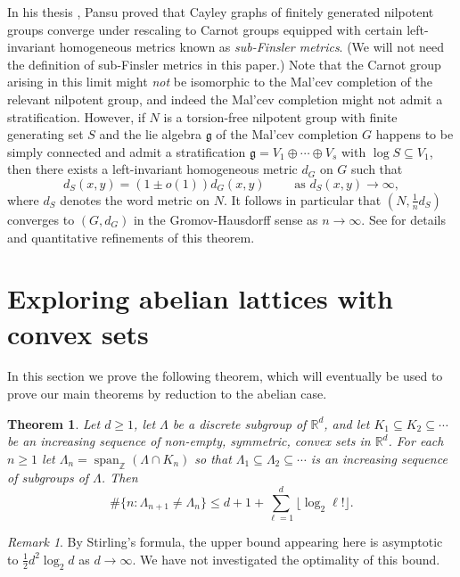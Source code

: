\documentclass[11pt]{article}
\numberwithin{equation}{section}
\theoremstyle{plain}
\newtheorem{thm}{Theorem}[section]
\theoremstyle{definition}
\theoremstyle{remark}
\newtheorem{remark}{Remark}[section]
\numberwithin{equation}{section}
\newcommand{\R}{\mathbb R}
\newcommand{\Z}{\mathbb Z}
\numberwithin{equation}{section}
\newcommand{\spanZ}{\operatorname{span}_\Z}
\begin{document}
In his thesis \cite{pansu1983croissance}, Pansu proved that Cayley graphs of finitely generated nilpotent groups converge under rescaling to Carnot groups equipped with certain left-invariant homogeneous metrics known as \emph{sub-Finsler metrics}. (We will not need the definition of sub-Finsler metrics in this paper.) Note that the Carnot group arising in this limit might \emph{not} be isomorphic to the Mal'cev completion of the relevant nilpotent group, and indeed the Mal'cev completion might not admit a stratification. However, if $N$ is a torsion-free nilpotent group with finite generating set $S$ and the lie algebra $\mathfrak{g}$ of the Mal'cev completion $G$ happens to be simply connected and admit a stratification $\mathfrak{g}=V_1\oplus \cdots \oplus V_s$ with $\log S \subseteq V_1$, then there exists a left-invariant homogeneous metric $d_G$ on $G$ such that
\begin{equation}
\label{eq:Pansu}
d_S(x,y)=(1\pm o(1)) d_G(x,y) \qquad \text{ as $d_S(x,y)\to \infty$},
\end{equation}
where $d_S$ denotes the word metric on $N$. It follows in particular that $(N,\frac{1}{n}d_S)$ converges to $(G,d_G)$ in the Gromov-Hausdorff sense as $n\to\infty$. See \cite{breuillard2013rate,tashiro2022speed} for details and quantitative refinements of this theorem.



\section{Exploring abelian lattices with convex sets}
\label{sec:Abelian}

In this section we prove the following theorem, which will eventually be used to prove our main theorems by reduction to the abelian case.

\begin{thm}
\label{thm:Abelian_convex}
Let $d\geq 1$, let $\Lambda$ be a discrete subgroup of $\R^d$, and let $K_1 \subseteq K_2 \subseteq \cdots$ be an increasing sequence of non-empty, symmetric, convex sets in $\R^d$. For each $n\geq 1$ let $\Lambda_n = \spanZ(\Lambda \cap K_n)$ so that $\Lambda_1 \subseteq \Lambda_2 \subseteq \cdots$ is an increasing sequence of subgroups of $\Lambda$. Then 
\[
\#\{n :\Lambda_{n+1}\neq \Lambda_n\} \leq d +1 + \sum_{\ell=1}^d \lfloor \log_2 \ell! \rfloor.
\]
\end{thm}

\begin{remark}
By Stirling's formula, the upper bound appearing here is asymptotic to $\frac{1}{2}d^2 \log_2 d$ as $d\to \infty$. We have not investigated the optimality of this bound.
\end{remark}
\end{document}
